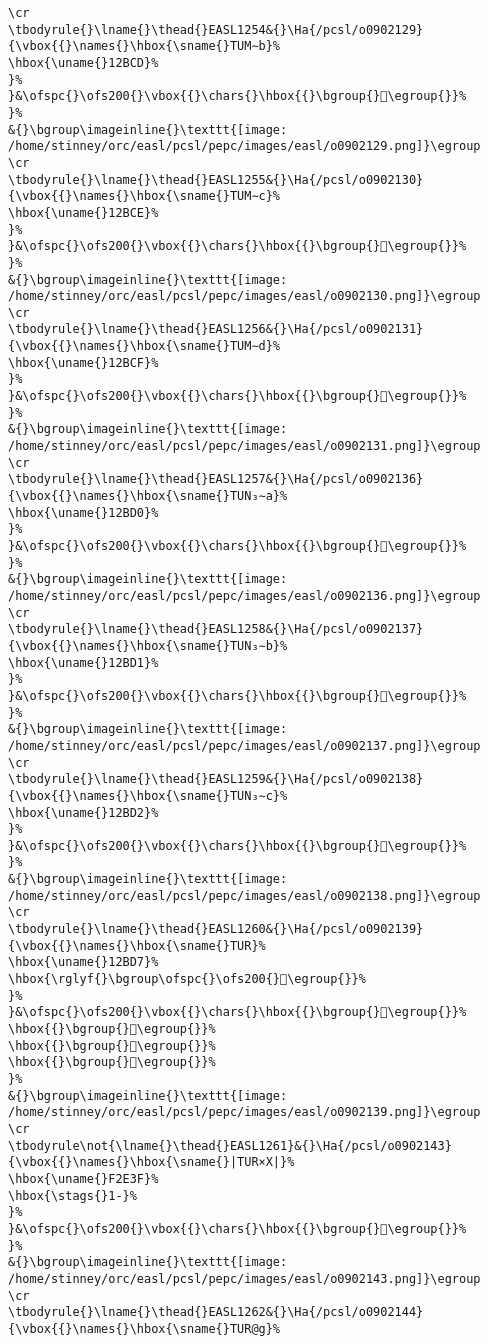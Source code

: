 \begin{verbatim}
\cr
\tbodyrule{}\lname{}\thead{}EASL1254&{}\Ha{/pcsl/o0902129}{\vbox{{}\names{}\hbox{\sname{}TUM∼b}%
\hbox{\uname{}12BCD}%
}%
}&\ofspc{}\ofs200{}\vbox{{}\chars{}\hbox{{}\bgroup{}𒯍\egroup{}}%
}%
&{}\bgroup\imageinline{}\texttt{[image: /home/stinney/orc/easl/pcsl/pepc/images/easl/o0902129.png]}\egroup
\cr
\tbodyrule{}\lname{}\thead{}EASL1255&{}\Ha{/pcsl/o0902130}{\vbox{{}\names{}\hbox{\sname{}TUM∼c}%
\hbox{\uname{}12BCE}%
}%
}&\ofspc{}\ofs200{}\vbox{{}\chars{}\hbox{{}\bgroup{}𒯎\egroup{}}%
}%
&{}\bgroup\imageinline{}\texttt{[image: /home/stinney/orc/easl/pcsl/pepc/images/easl/o0902130.png]}\egroup
\cr
\tbodyrule{}\lname{}\thead{}EASL1256&{}\Ha{/pcsl/o0902131}{\vbox{{}\names{}\hbox{\sname{}TUM∼d}%
\hbox{\uname{}12BCF}%
}%
}&\ofspc{}\ofs200{}\vbox{{}\chars{}\hbox{{}\bgroup{}𒯏\egroup{}}%
}%
&{}\bgroup\imageinline{}\texttt{[image: /home/stinney/orc/easl/pcsl/pepc/images/easl/o0902131.png]}\egroup
\cr
\tbodyrule{}\lname{}\thead{}EASL1257&{}\Ha{/pcsl/o0902136}{\vbox{{}\names{}\hbox{\sname{}TUN₃∼a}%
\hbox{\uname{}12BD0}%
}%
}&\ofspc{}\ofs200{}\vbox{{}\chars{}\hbox{{}\bgroup{}𒯐\egroup{}}%
}%
&{}\bgroup\imageinline{}\texttt{[image: /home/stinney/orc/easl/pcsl/pepc/images/easl/o0902136.png]}\egroup
\cr
\tbodyrule{}\lname{}\thead{}EASL1258&{}\Ha{/pcsl/o0902137}{\vbox{{}\names{}\hbox{\sname{}TUN₃∼b}%
\hbox{\uname{}12BD1}%
}%
}&\ofspc{}\ofs200{}\vbox{{}\chars{}\hbox{{}\bgroup{}𒯑\egroup{}}%
}%
&{}\bgroup\imageinline{}\texttt{[image: /home/stinney/orc/easl/pcsl/pepc/images/easl/o0902137.png]}\egroup
\cr
\tbodyrule{}\lname{}\thead{}EASL1259&{}\Ha{/pcsl/o0902138}{\vbox{{}\names{}\hbox{\sname{}TUN₃∼c}%
\hbox{\uname{}12BD2}%
}%
}&\ofspc{}\ofs200{}\vbox{{}\chars{}\hbox{{}\bgroup{}𒯒\egroup{}}%
}%
&{}\bgroup\imageinline{}\texttt{[image: /home/stinney/orc/easl/pcsl/pepc/images/easl/o0902138.png]}\egroup
\cr
\tbodyrule{}\lname{}\thead{}EASL1260&{}\Ha{/pcsl/o0902139}{\vbox{{}\names{}\hbox{\sname{}TUR}%
\hbox{\uname{}12BD7}%
\hbox{\rglyf{}\bgroup\ofspc{}\ofs200{}𒯗\egroup{}}%
}%
}&\ofspc{}\ofs200{}\vbox{{}\chars{}\hbox{{}\bgroup{}𒯓\egroup{}}%
\hbox{{}\bgroup{}𒯕\egroup{}}%
\hbox{{}\bgroup{}𒯖\egroup{}}%
\hbox{{}\bgroup{}𒯗\egroup{}}%
}%
&{}\bgroup\imageinline{}\texttt{[image: /home/stinney/orc/easl/pcsl/pepc/images/easl/o0902139.png]}\egroup
\cr
\tbodyrule\not{\lname{}\thead{}EASL1261}&{}\Ha{/pcsl/o0902143}{\vbox{{}\names{}\hbox{\sname{}|TUR×X|}%
\hbox{\uname{}F2E3F}%
\hbox{\stags{}1-}%
}%
}&\ofspc{}\ofs200{}\vbox{{}\chars{}\hbox{{}\bgroup{}󲸿\egroup{}}%
}%
&{}\bgroup\imageinline{}\texttt{[image: /home/stinney/orc/easl/pcsl/pepc/images/easl/o0902143.png]}\egroup
\cr
\tbodyrule{}\lname{}\thead{}EASL1262&{}\Ha{/pcsl/o0902144}{\vbox{{}\names{}\hbox{\sname{}TUR@g}%

\end{verbatim}
